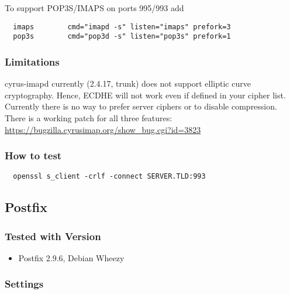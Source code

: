 To support POP3S/IMAPS on ports 995/993 add
\begin{lstlisting}
  imaps        cmd="imapd -s" listen="imaps" prefork=3
  pop3s        cmd="pop3d -s" listen="pop3s" prefork=1
\end{lstlisting}


\subsubsection{Limitations}

cyrus-imapd currently (2.4.17, trunk) does not support elliptic curve cryptography. Hence, ECDHE will not work even if defined in your cipher list.\\

Currently there is no way to prefer server ciphers or to disable compression.\\

There is a working patch for all three features:
\url{https://bugzilla.cyrusimap.org/show_bug.cgi?id=3823}\\

\subsubsection{How to test}
\begin{lstlisting}
  openssl s_client -crlf -connect SERVER.TLD:993
\end{lstlisting}




\subsection{Postfix}

\subsubsection{Tested with Version}
\begin{itemize}
\item Postfix 2.9.6, Debian Wheezy
\end{itemize}

\subsubsection{Settings}

